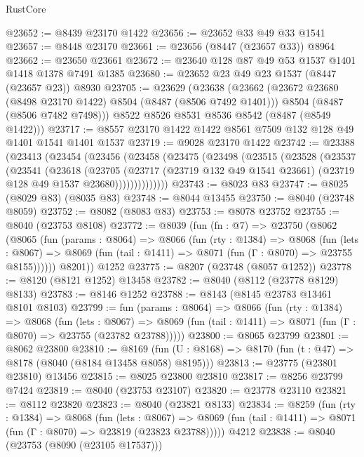 \begin{lexlean}{RustCore}
\begin{coremodule}
@23652 := @8439 @23170 @1422
@23656 := @23652 @33 @49 @33 @1541
@23657 := @8448 @23170
@23661 := @23656 (@8447 (@23657 @33)) @8964
@23662 := @23650 @23661
@23672 := @23640 @128 @87 @49 @53 @1537 @1401 @1418 @1378 @7491 @1385
@23680 := @23652 @23 @49 @23 @1537 (@8447 (@23657 @23)) @8930
@23705 := @23629
    (@23638
      (@23662
        (@23672 @23680 (@8498 @23170 @1422) @8504 (@8487 (@8506 @7492 @1401)))
        @8504
        (@8487 (@8506 @7482 @7498)))
      @8522
      @8526
      @8531
      @8536
      @8542
      (@8487 (@8549 @1422)))
@23717 := @8557 @23170 @1422 @1422 @8561 @7509 @132 @128 @49 @1401 @1541 @1401 @1537
@23719 := @9028 @23170 @1422
@23742 := @23388
    (@23413
      (@23454
        (@23456
          (@23458
            (@23475
              (@23498
                (@23515
                  (@23528
                    (@23537
                      (@23541
                        (@23618
                          (@23705
                            (@23717
                              (@23719 @132 @49 @1541 @23661)
                              (@23719 @128 @49 @1537 @23680))))))))))))))
@23743 := @8023 @83
@23747 := @8025 (@8029 @83) (@8035 @83)
@23748 := @8044 @13455
@23750 := @8040 (@23748 @8059)
@23752 := @8082 (@8083 @83)
@23753 := @8078 @23752
@23755 := @8040 (@23753 @8108)
@23772 := @8039
    (fun (fn : @7) =>
    @23750
      (@8062
        (@8065
          (fun (params : @8064) =>
          @8066
            (fun (rty : @1384) =>
            @8068
              (fun (lets : @8067) =>
              @8069 (fun (tail : @1411) => @8071 (fun (Γ : @8070) => @23755 @8155))))))
        @8201))
    @1252
@23775 := @8207 (@23748 (@8057 @1252))
@23778 := @8120 (@8121 @1252) @13458
@23782 := @8040 (@8112 (@23778 @8129) @8133)
@23783 := @8146 @1252
@23788 := @8143 (@8145 @23783 @13461 @8101 @8103)
@23799 := fun (params : @8064) =>
  @8066
    (fun (rty : @1384) =>
    @8068
      (fun (lets : @8067) =>
      @8069 (fun (tail : @1411) => @8071 (fun (Γ : @8070) => @23755 (@23782 @23788)))))
@23800 := @8065 @23799
@23801 := @8062 @23800
@23810 := @8169
    (fun (U : @8168) => @8170 (fun (t : @47) => @8178 (@8040 (@8184 @13458 @8058) @8195)))
@23813 := @23775 (@23801 @23810) @13456
@23815 := @8025 @23800 @23810
@23817 := @8256 @23799 @7424
@23819 := @8040 (@23753 @23107)
@23820 := @23778 @23110
@23821 := @8112 @23820
@23823 := @8040 (@23821 @8133)
@23834 := @8259
    (fun (rty : @1384) =>
    @8068
      (fun (lets : @8067) =>
      @8069 (fun (tail : @1411) => @8071 (fun (Γ : @8070) => @23819 (@23823 @23788)))))
    @4212
@23838 := @8040 (@23753 (@8090 (@23105 @17537)))

\end{coremodule}
\end{lexlean}

